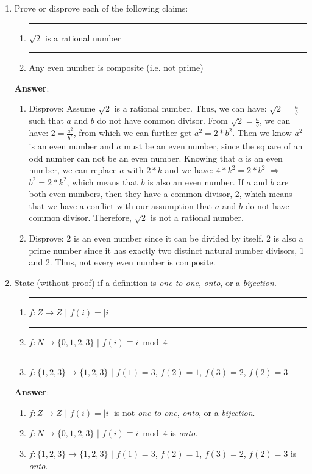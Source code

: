 \documentclass{article}%
\begin{document}
\begin{enumerate}
	\item Prove or disprove each of the following claims:
	\begin{enumerate}
	\item \rule{0.5 in}{1 pt} $\sqrt 2$ is a rational number 
	\item \rule{0.5 in}{1 pt} Any even number is composite (i.e. not prime)
	\end{enumerate}

	\textbf{Answer}:
	\begin{enumerate}
	\item Disprove: Assume $\sqrt{2}$ is a rational number. Thus, we can have: $\sqrt{2}=\frac{a}{b}$ such that $a$ and $b$ do not have common divisor. From $\sqrt{2}=\frac{a}{b}$, we can have: $2=\frac{a^{2}}{b^{2}}$, from which we can further get $a^{2}=2*b^{2}$. Then we know $a^{2}$ is an even number and $a$ must be an even number, since the square of an odd number can not be an even number. Knowing that $a$ is an even number, we can replace $a$ with $2*k$ and we have: $4*k^{2}=2*b^{2}$ $\Rightarrow$ $b^{2} = 2*k^{2}$, which means that $b$ is also an even number. If $a$ and $b$ are both even numbers, then they have a common divisor, 2, which means that we have a conflict with our assumption that $a$ and $b$ do not have common divisor. Therefore, $\sqrt{2}$ is not a rational number.
	\item Disprove: 2 is an even number since it can be divided by itself. 2 is also a prime number since it has exactly two distinct natural number divisors, 1 and 2. Thus, not every even number is composite. 	
	\end{enumerate}

	\item State (without proof) if a definition is \textsl{one-to-one}, \textsl{onto}, or a \textsl{bijection}.
	\begin{enumerate}
	\item \rule{0.5 in}{1 pt} $f: Z \to Z$ $|$ $f(i) = |i|$ 
	\item \rule{0.5 in}{1 pt} $f: N \to \{0,1,2,3\}$ $|$ $f(i) \equiv i\bmod 4$
	\item \rule{0.5 in}{1 pt} $f: \{1,2,3\} \to \{1,2,3\}$ $|$ $f(1)=3$, $f(2)=1$, $f(3)=2$, $f(2)=3$
	\end{enumerate}
	
	\textbf{Answer}:
	
	\begin{enumerate}
	\item $f: Z \to Z$ $|$ $f(i) = |i|$ is not \textsl{one-to-one}, \textsl{onto}, or a \textsl{bijection}.
	\item $f: N \to \{0,1,2,3\}$ $|$ $f(i) \equiv i\bmod 4$ is \textsl{onto}.
	\item $f: \{1,2,3\} \to \{1,2,3\}$ $|$ $f(1)=3$, $f(2)=1$, $f(3)=2$, $f(2)=3$ is \textsl{onto}.
	\end{enumerate}
	

\end{enumerate}
\end{document}
